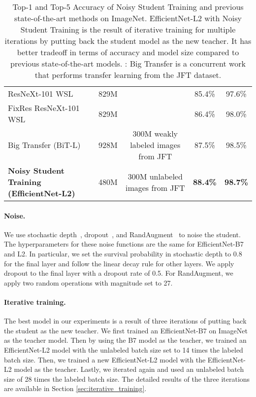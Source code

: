 \documentclass[10pt,twocolumn,letterpaper]{article}
\begin{document}
\begin{table*}[h!]
\begin{tabular}{l|cc|cc}
        ResNeXt-101 WSL \cite{mahajan2018exploring} & 829M &   & 85.4\% & 97.6\% \\
         FixRes ResNeXt-101 WSL \cite{touvron2019fixing} & 829M  &  & 86.4\% &  98.0\%  \\
         \midrule
         Big Transfer (BiT-L) \cite{kolesnikov2019large} & 928M  & 300M weakly labeled images from JFT & 87.5\% &  98.5\%  \\
         \midrule
         \bf Noisy Student Training (EfficientNet-L2) &  480M & 300M unlabeled images from JFT & \bf 88.4\% & \bf 98.7\%  \\
        \bottomrule
        \end{tabular}
    \caption{Top-1 and Top-5 Accuracy of Noisy Student Training and  previous state-of-the-art methods on ImageNet. EfficientNet-L2  with Noisy Student Training is the result of iterative training for multiple iterations by putting back the student model as the new teacher. It has better tradeoff in terms of accuracy and model size compared to previous state-of-the-art models. : Big Transfer is a concurrent work that performs transfer learning from the JFT dataset. 
    }  
    \label{tab:imagenet}
\end{table*}


\paragraph{Noise.} We use stochastic depth~\cite{huang2016deep}, dropout~\cite{srivastava2014dropout}, and RandAugment~\cite{cubuk2019randaugment} to noise the student. The hyperparameters for these noise functions are the same for EfficientNet-B7 and L2. In particular, we set the survival probability in stochastic depth to 0.8 for the final layer and follow the linear decay rule for other layers. We apply dropout to the final  layer with a dropout rate of 0.5. For RandAugment, we apply two random operations with magnitude set to 27.

\paragraph{Iterative training.} The best model in our experiments is a result of three iterations of putting back the student as the new teacher.
We first trained an EfficientNet-B7 on ImageNet as the teacher model. Then by using the B7 model as the teacher, we trained an EfficientNet-L2 model with the unlabeled batch size set to 14 times the labeled batch size. Then, we trained a new EfficientNet-L2 model with the EfficientNet-L2 model as the teacher. Lastly, we iterated again and used an unlabeled batch size of 28 times the labeled batch size. The detailed results of the three iterations are available in Section \ref{sec:iterative_training}.
\end{document}
